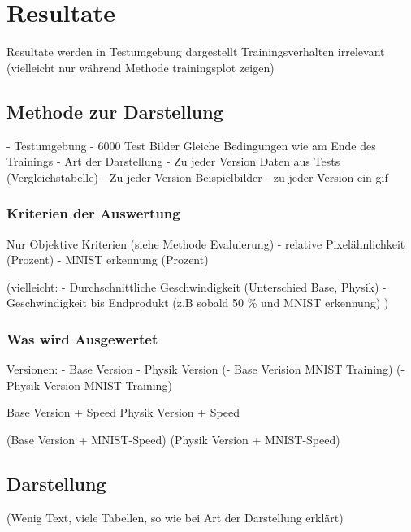 \chapter{Resultate}
Resultate werden in Testumgebung dargestellt 
Trainingsverhalten irrelevant 
(vielleicht nur während Methode trainingsplot zeigen)

\section{Methode zur Darstellung}
- Testumgebung
    - 6000 Test Bilder
    Gleiche Bedingungen wie am Ende des Trainings
- Art der Darstellung
    - Zu jeder Version Daten aus Tests (Vergleichstabelle)
    - Zu jeder Version Beispielbilder
    - zu jeder Version ein gif

\subsection*{Kriterien der Auswertung}
Nur Objektive Kriterien (siehe Methode Evaluierung)
    - relative Pixelähnlichkeit (Prozent)
    - MNIST erkennung (Prozent)
    
    (vielleicht:
      - Durchschnittliche Geschwindigkeit (Unterschied Base, Physik)
      - Geschwindigkeit bis Endprodukt (z.B sobald 50 \% und MNIST erkennung)
    )

    
\subsection*{Was wird Ausgewertet}
Versionen:
    - Base Version
    - Physik Version
    (- Base Verision MNIST Training)
    (- Physik Version MNIST Training)

    Base Version + Speed 
    Physik Version + Speed 
    
    (Base Version + MNIST-Speed)
    (Physik Version + MNIST-Speed)


\section{Darstellung}
(Wenig Text, viele Tabellen, so wie bei Art der Darstellung erklärt)








